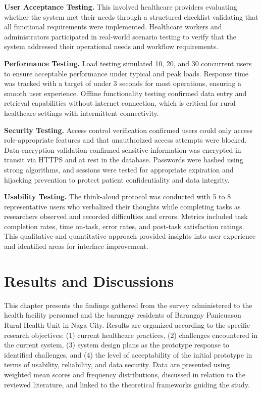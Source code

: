 \documentclass{research}
\begin{document}
\textbf{User Acceptance Testing.} This involved healthcare providers evaluating whether the system met their needs through a structured checklist validating that all functional requirements were implemented. Healthcare workers and administrators participated in real-world scenario testing to verify that the system addressed their operational needs and workflow requirements.

\textbf{Performance Testing.} Load testing simulated 10, 20, and 30 concurrent users to ensure acceptable performance under typical and peak loads. Response time was tracked with a target of under 3 seconds for most operations, ensuring a smooth user experience. Offline functionality testing confirmed data entry and retrieval capabilities without internet connection, which is critical for rural healthcare settings with intermittent connectivity.

\textbf{Security Testing.} Access control verification confirmed users could only access role-appropriate features and that unauthorized access attempts were blocked. Data encryption validation confirmed sensitive information was encrypted in transit via HTTPS and at rest in the database. Passwords were hashed using strong algorithms, and sessions were tested for appropriate expiration and hijacking prevention to protect patient confidentiality and data integrity.

\textbf{Usability Testing.} The think-aloud protocol was conducted with 5 to 8 representative users who verbalized their thoughts while completing tasks as researchers observed and recorded difficulties and errors. Metrics included task completion rates, time on-task, error rates, and post-task satisfaction ratings. This qualitative and quantitative approach provided insights into user experience and identified areas for interface improvement.


\clearpage

\chapter{Results and Discussions}
This chapter presents the findings gathered from the survey administered to the health facility personnel and the barangay residents of Barangay Panicuason Rural Health Unit in Naga City. Results are organized according to the specific research objectives: (1) current healthcare practices, (2) challenges encountered in the current system, (3) system design plans as the prototype response to identified challenges, and (4) the level of acceptability of the initial prototype in terms of usability, reliability, and data security. Data are presented using weighted mean scores and frequency distributions, discussed in relation to the reviewed literature, and linked to the theoretical frameworks guiding the study. 
\end{document}
